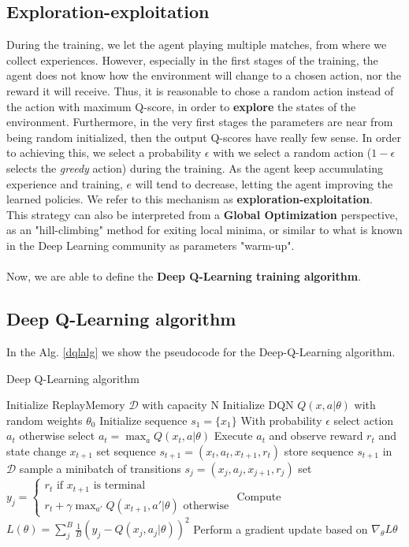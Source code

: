 \documentclass{article}
\begin{document}
\subsection{Exploration-exploitation}
During the training, we let the agent playing multiple matches, from where we collect experiences. However, especially in the first stages of the training, the agent does not know how the environment will change to a chosen action, nor the reward it will receive. Thus, it is reasonable to chose a random action instead of the action with maximum Q-score, in order to \textbf{explore} the states of the environment. Furthermore, in the very first stages the parameters are near from being random initialized, then the output Q-scores have really few sense. In order to achieving this, we select a probability $\epsilon$ with we select a random action ($1 - \epsilon$ selects the \textit{greedy} action) during the training. As the agent keep accumulating experience and training, $e$ will tend to decrease, letting the agent improving the learned policies. We refer to this mechanism as \textbf{exploration-exploitation}.\\
This strategy can also be interpreted from a \textbf{Global Optimization} perspective, as an "hill-climbing" method for exiting local minima, or similar to what is known in the Deep Learning community as parameters "warm-up".
\\
\\
Now, we are able to define the \textbf{Deep Q-Learning training algorithm}.
\subsection{Deep Q-Learning algorithm}
In the Alg. \ref{dqlalg} we show the pseudocode for the Deep-Q-Learning algorithm.
\begin{algorithm}[!h]
	\caption{Deep Q-Learning algorithm}
	\label{dqlalg}
	\begin{algorithmic}
		\State Initialize ReplayMemory $\mathcal{D}$ with capacity N
		\State Initialize DQN $Q(x, a|\theta)$ with random weights $\theta_0$
		\State Initialize sequence $s_1=\{x_1\}$
			\State With probability $\epsilon$ select action $a_t$ 
			\State otherwise select $a_t=\max_{a}Q(x_t, a|\theta)$
			\State Execute $a_t$ and observe reward $r_t$ and state change $x_{t+1}$
			\State set sequence $s_{t+1}=(x_t, a_t, x_{t+1}, r_t)$ 
			\State store sequence $s_{t+1}$ in $\mathcal{D}$
			\State sample a minibatch of transitions $s_j=(x_j, a_j, x_{j+1}, r_j)$
			\State set $y_j = 
			\begin{cases}
				r_t \text{ if $x_{t+1}$ is terminal} \\
				r_t + \gamma\max_{a'}Q(x_{t+1}, a'|\theta) \text{ otherwise}
			\end{cases}
			$
			\State Compute $L(\theta) = \sum_{j}^{B} \frac{1}{B} (y_j - Q(x_j, a_j|\theta) )^2 $
			\State Perform a gradient update based on $\nabla_\theta L\theta$
		\EndFor		
		\EndFor
	\end{algorithmic}
\end{algorithm}
\end{document}
